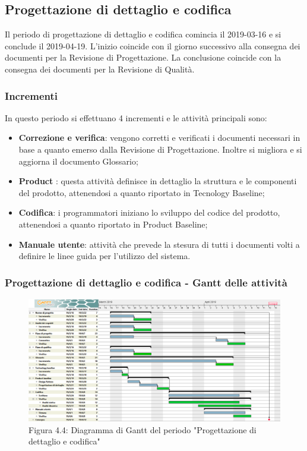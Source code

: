 \subsection{Progettazione di dettaglio e codifica}
Il periodo di progettazione di dettaglio e codifica comincia il 2019-03-16 e si conclude il 2019-04-19. L'inizio coincide con il giorno successivo alla consegna dei documenti per la Revisione di Progettazione. La conclusione coincide con la consegna dei documenti per la Revisione di Qualità. 
\subsubsection{Incrementi}
In questo periodo si effettuano 4 incrementi e le attività principali sono:
\begin{itemize}
\item{\textbf{Correzione e verifica}: vengono corretti e verificati i documenti necessari in base a quanto emerso dalla Revisione di Progettazione. Inoltre si migliora e si aggiorna il documento Glossario;} 
\item{\textbf{Product }: questa attività definisce in dettaglio la struttura e le componenti del prodotto, attenendosi a quanto riportato in Tecnology Baseline;} 
\item{\textbf{Codifica}: i programmatori iniziano lo sviluppo del codice del prodotto, attenendosi a quanto riportato in Product Baseline;}	
\item{\textbf{Manuale utente}: attività che prevede la stesura di tutti i documenti volti a definire le linee guida per l'utilizzo del sistema.}
\end{itemize}

\subsubsection{Progettazione di dettaglio e codifica - Gantt delle attività}

\begin{figure} [H]
	\centering
	\includegraphics[scale=0.35]{Res/Gantt/Codifica}
	\caption{Figura 4.4: Diagramma di Gantt del periodo "Progettazione di dettaglio e codifica"}\label{}
\end{figure}

\pagebreak

